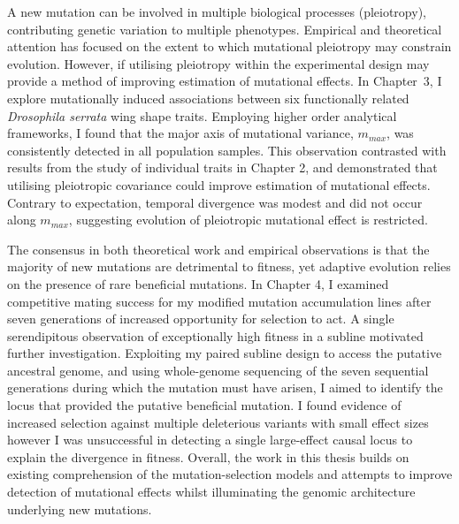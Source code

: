 A new mutation can be involved in multiple biological processes (pleiotropy), contributing genetic variation to multiple phenotypes. Empirical and theoretical attention has focused on the extent to which mutational pleiotropy may constrain evolution. However, if utilising pleiotropy within the experimental design may provide a method of improving estimation of mutational effects. In Chapter~3, I explore mutationally induced associations between six functionally related \textit{Drosophila serrata} wing shape traits. Employing higher order analytical frameworks, I found that the major axis of mutational variance, $m_{max}$, was consistently detected in all population samples. This observation contrasted with results from the study of individual traits in Chapter 2, and demonstrated that utilising pleiotropic covariance could improve estimation of mutational effects. Contrary to expectation, temporal divergence was modest and did not occur along $m_{max}$, suggesting evolution of pleiotropic mutational effect is restricted. \par

The consensus in both theoretical work and empirical observations is that the majority of new mutations are detrimental to fitness, yet adaptive evolution relies on the presence of rare beneficial mutations. In Chapter 4, I examined competitive mating success for my modified mutation accumulation lines after seven generations of increased opportunity for selection to act. A single serendipitous observation of exceptionally high fitness in a subline motivated further investigation. Exploiting my paired subline design to access the putative ancestral genome, and using whole-genome sequencing of the seven sequential generations during which the mutation must have arisen, I aimed to identify the locus that provided the putative beneficial mutation. I found evidence of increased selection against multiple deleterious variants with small effect sizes however I was unsuccessful in detecting a single large-effect causal locus to explain the divergence in fitness. Overall, the work in this thesis builds on existing comprehension of the mutation-selection models and attempts to improve detection of mutational effects whilst illuminating the genomic architecture underlying new mutations. \par

